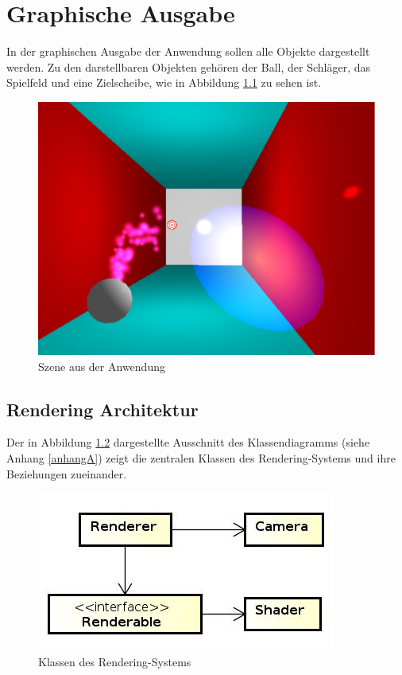 
\chapter{Graphische Ausgabe}
\label{Kapitel 2}
%
In der graphischen Ausgabe der Anwendung sollen alle Objekte dargestellt werden. Zu den darstellbaren Objekten gehören der Ball, der Schläger, das Spielfeld und eine Zielscheibe, wie in Abbildung \ref{fig:gameScene} zu sehen ist.

\begin{figure}[h]
	\centering
	\includegraphics[width=0.6\linewidth]{bilder/gameScene}
	\caption{Szene aus der Anwendung}
	\label{fig:gameScene}
\end{figure}


\section{Rendering Architektur}
\label{Kapitel_2_-_Unterkapitel_1}
%
Der in Abbildung \ref{fig:renderingSystem} dargestellte Ausschnitt des Klassendiagramms (siehe Anhang \ref{anhangA}) zeigt die zentralen Klassen des Rendering-Systems und ihre Beziehungen zueinander.

\begin{figure}[h]
	\centering
	\includegraphics[width=0.6\linewidth]{bilder/RenderingSystem}
	\caption{Klassen des Rendering-Systems}
	\label{fig:renderingSystem}
\end{figure}

